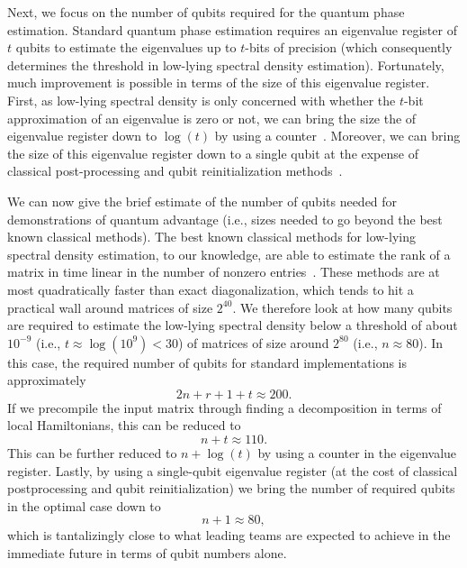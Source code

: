 \documentclass[a4paper, onecolumn, accepted=2022-08-28]{quantumarticle}
\begin{document}
Next, we focus on the number of qubits required for the quantum phase estimation.
Standard quantum phase estimation requires an eigenvalue register of $t$ qubits to estimate the eigenvalues up to $t$-bits of precision (which consequently determines the threshold in low-lying spectral density estimation). 
Fortunately, much improvement is possible in terms of the size of this eigenvalue register.
First, as low-lying spectral density is only concerned with whether the $t$-bit approximation of an eigenvalue is zero or not, we can bring the size the of eigenvalue register down to $\log(t)$ by using a counter~\cite{rennela:counter}.
Moreover, we can bring the size of this eigenvalue register down to a single qubit at the expense of classical post-processing and qubit reinitialization methods~\cite{dutkiewicz:qpe, tom:qpe, somma:qpe}.

We can now give the brief estimate of the number of qubits needed for demonstrations of quantum advantage (i.e., sizes needed to go beyond the best known classical methods).
The best known classical methods for low-lying spectral density estimation, to our knowledge, are able to estimate the rank of a matrix in time linear in the number of nonzero entries~\cite{ubaru:approximate_rank, cheung:rank, napoli:eigenvalue_counts, lin:spectral_density}.
These methods are at most quadratically faster than exact diagonalization, which tends to hit a practical wall around matrices of size $2^{40}$.
We therefore look at how many qubits are required to estimate the low-lying spectral density below a threshold of about $10^{-9}$ (i.e., $t \approx \log(10^{9}) < 30$) of matrices of size around $2^{80}$ (i.e., $n \approx 80$).
In this case, the required number of qubits for standard implementations is approximately
\[
  2n + r + 1 + t \approx 200.
\]
If we precompile the input matrix through finding a decomposition in terms of local Hamiltonians, this can be reduced to
\[
n + t \approx 110.
\]
This can be further reduced to $n + \log(t)$ by using a counter in the eigenvalue register.
Lastly, by using a single-qubit eigenvalue register (at the cost of classical postprocessing and qubit reinitialization) we bring the number of required qubits in the optimal case down to 
\[
n + 1 \approx 80,
\]
which is tantalizingly close to what leading teams are expected to achieve in the immediate future in terms of qubit numbers alone.
\end{document}

